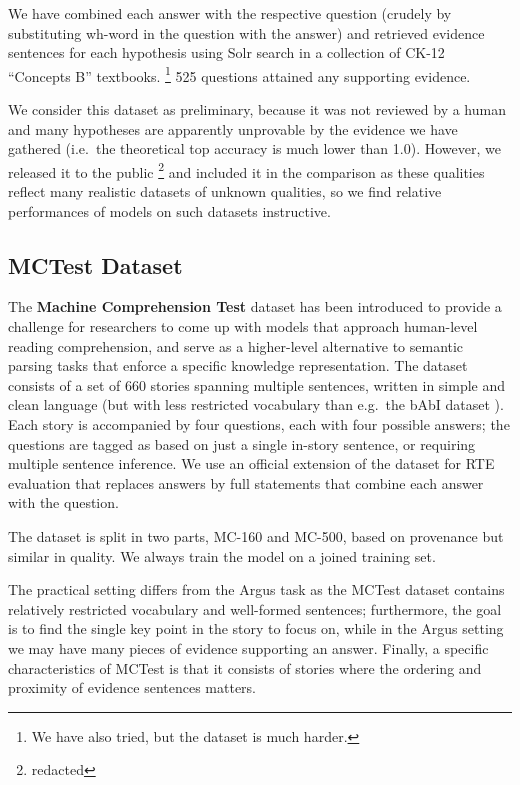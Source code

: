 \documentclass[11pt]{article}
\begin{document}
We have combined each answer with the respective question (crudely by
substituting wh-word in the question with the answer) and retrieved
evidence sentences for each hypothesis using Solr search in a collection
of CK-12 ``Concepts B'' textbooks.%
\footnote{We have also tried, but the dataset is much harder.}
525 questions attained any supporting evidence.

We consider this dataset as preliminary, because it was not reviewed
by a human and many hypotheses are apparently unprovable by the evidence
we have gathered (i.e.\ the theoretical top accuracy is much lower
than 1.0).  However, we released it to the public%
\footnote{redacted}
and included it in the comparison as these
qualities reflect many realistic datasets of unknown qualities, so
we find relative performances of models on such datasets instructive.


\subsection{MCTest Dataset}

The \textbf{Machine Comprehension Test} \cite{MCTest} dataset has been introduced
to provide a challenge for researchers to come up with models that approach
human-level reading comprehension, and serve as a higher-level alternative
to semantic parsing tasks that enforce a specific knowledge representation.
The dataset consists of a set of 660 stories spanning
multiple sentences, written in simple and clean language (but with less restricted
vocabulary than e.g.\ the bAbI dataset \cite{bAbI}).  Each story is accompanied
by four questions, each with four possible answers; the questions are tagged
as based on just a single in-story sentence, or requiring multiple sentence inference.
We use an official extension of the dataset for RTE evaluation
that replaces answers by full statements that combine each answer with the question.

The dataset is split in two parts, MC-160 and MC-500, based on provenance but
similar in quality.
We always train the model on a joined training set.

The practical setting differs from the Argus task as the MCTest dataset contains
relatively restricted vocabulary and well-formed sentences; furthermore,
the goal is to find the single key point in the story to focus on, while
in the Argus setting we may have many pieces of evidence supporting an answer.
Finally, a specific characteristics of MCTest is that it consists of stories
where the ordering and proximity of evidence sentences matters.
\end{document}

